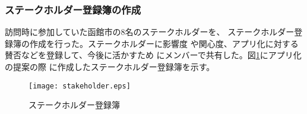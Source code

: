 ﻿\subsubsection{ステークホルダー登録簿の作成}
訪問時に参加していた函館市の8名のステークホルダーを、
ステークホルダー登録簿の作成を行った。ステークホルダーに影響度
や関心度、アプリ化に対する賛否などを登録して、今後に活かすため
にメンバーで共有した。図\ref{fig:addsh}にアプリ化の提案の際
に作成したステークホルダー登録簿を示す。

\begin{figure}[htbp]
\centering
\texttt{[image: stakeholder.eps]}
\caption{ステークホルダー登録簿}
\label{fig:addsh}
\end{figure}


